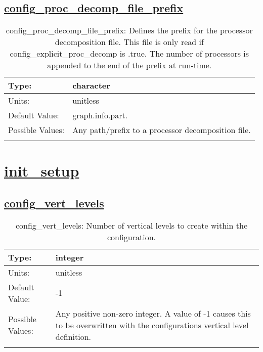 \subsection[config\_proc\_decomp\_file\_prefix]{\hyperref[sec:nm_tab_decomposition]{config\_proc\_decomp\_file\_prefix}}
\label{subsec:nm_sec_config_proc_decomp_file_prefix}
\begin{center}
\begin{longtable}{| p{2.0in} || p{4.0in} |}
    \hline
    Type: & character \\
    \hline
    Units: & \si{unitless} \\
    \hline
    Default Value: & graph.info.part. \\
    \hline
    Possible Values: & Any path/prefix to a processor decomposition file. \\
    \hline
    \caption{config\_proc\_decomp\_file\_prefix: Defines the prefix for the processor decomposition file. This file is only read if config\_explicit\_proc\_decomp is .true. The number of processors is appended to the end of the prefix at run-time.}
\end{longtable}
\end{center}
\section[init\_setup]{\hyperref[sec:nm_tab_init_setup]{init\_setup}}
\label{sec:nm_sec_init_setup}
\subsection[config\_vert\_levels]{\hyperref[sec:nm_tab_init_setup]{config\_vert\_levels}}
\label{subsec:nm_sec_config_vert_levels}
\begin{center}
\begin{longtable}{| p{2.0in} || p{4.0in} |}
    \hline
    Type: & integer \\
    \hline
    Units: & \si{unitless} \\
    \hline
    Default Value: & -1 \\
    \hline
    Possible Values: & Any positive non-zero integer. A value of -1 causes this to be overwritten with the configurations vertical level definition. \\
    \hline
    \caption{config\_vert\_levels: Number of vertical levels to create within the configuration.}
\end{longtable}
\end{center}
